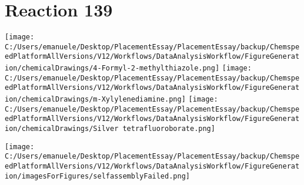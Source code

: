 \documentclass{article}%
\begin{document}
\section*{Reaction 139}%
%
\begin{scheme}[H]%
\begin{minipage}{0.5\textwidth}%
\texttt{[image: C:/Users/emanuele/Desktop/PlacementEssay/PlacementEssay/backup/ChemspeedPlatformAllVersions/V12/Workflows/DataAnalysisWorkflow/FigureGeneration/chemicalDrawings/4-Formyl-2-methylthiazole.png]}%
\texttt{[image: C:/Users/emanuele/Desktop/PlacementEssay/PlacementEssay/backup/ChemspeedPlatformAllVersions/V12/Workflows/DataAnalysisWorkflow/FigureGeneration/chemicalDrawings/m-Xylylenediamine.png]}%
\texttt{[image: C:/Users/emanuele/Desktop/PlacementEssay/PlacementEssay/backup/ChemspeedPlatformAllVersions/V12/Workflows/DataAnalysisWorkflow/FigureGeneration/chemicalDrawings/Silver tetrafluoroborate.png]}%
\end{minipage}%
\begin{minipage}{0.5\textwidth}%
\begin{center}%
\texttt{[image: C:/Users/emanuele/Desktop/PlacementEssay/PlacementEssay/backup/ChemspeedPlatformAllVersions/V12/Workflows/DataAnalysisWorkflow/FigureGeneration/imagesForFigures/selfassemblyFailed.png]}%
\end{center}%
\end{minipage}%
\caption{Self-assembly of components 1, 18, with Silver(I) in a 3.0:1.5:1.0 molar ratio in CH$_3$CN at 60\textdegree C for 40h. These are the reagents (starting materials) for reaction 139.}%
\end{scheme}%
\end{document}
